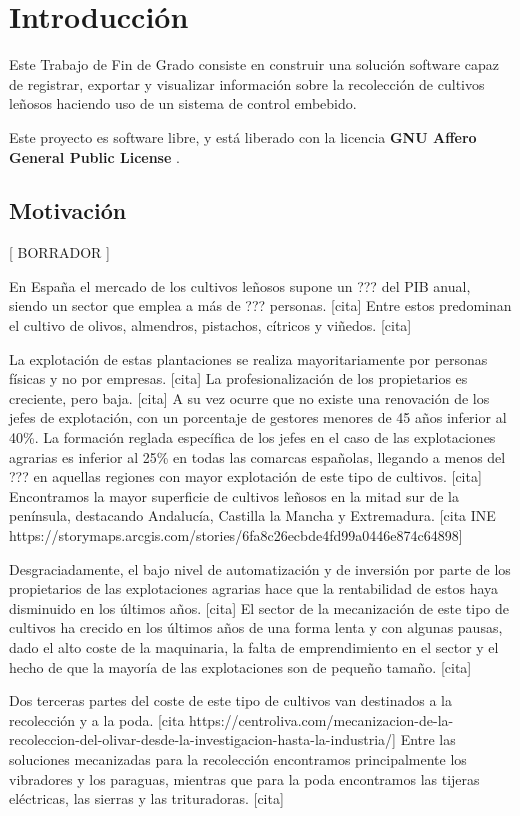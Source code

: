 \chapter{Introducción}

Este Trabajo de Fin de Grado consiste en construir una solución software
capaz de registrar, exportar y visualizar información sobre la recolección de cultivos
leñosos haciendo uso de un sistema de control embebido.

Este proyecto es software libre, y está liberado con
la licencia \textbf{GNU Affero General Public License} \cite{agplv3}.

\section{Motivación}

[ BORRADOR ]

En España el mercado de los cultivos leñosos supone un ??? del PIB
anual, siendo un sector que emplea a más de ??? personas. [cita] Entre estos
predominan el cultivo de olivos, almendros, pistachos, cítricos y
viñedos. [cita] 

La explotación de estas plantaciones se realiza mayoritariamente por personas
físicas y no por empresas. [cita] La profesionalización de los propietarios
es creciente, pero baja. [cita] A su vez ocurre que no existe una renovación
de los jefes de explotación, con un porcentaje de gestores menores de 45 años
inferior al 40\%. La formación reglada específica de los jefes en el caso de
las explotaciones agrarias es inferior al 25\% en todas las comarcas españolas,
llegando a menos del ??? en aquellas regiones con mayor
explotación de este tipo de cultivos. [cita] Encontramos la mayor superficie
de cultivos leñosos en la mitad sur de la península, destacando Andalucía,
Castilla la Mancha y Extremadura. [cita INE https://storymaps.arcgis.com/stories/6fa8c26ecbde4fd99a0446e874c64898]

Desgraciadamente, el bajo nivel de automatización y de inversión por parte
de los propietarios de las explotaciones agrarias hace que la rentabilidad
de estos haya disminuido en los últimos años. [cita]
El sector de la
mecanización de este tipo de cultivos ha crecido en los últimos años de una
forma lenta y con algunas pausas, dado el alto coste de la maquinaria, la
falta de emprendimiento en el sector y el hecho de que la mayoría de las
explotaciones son de pequeño tamaño. [cita] 

Dos terceras partes del
coste de este tipo de cultivos van destinados a la recolección y a la poda.
[cita https://centroliva.com/mecanizacion-de-la-recoleccion-del-olivar-desde-la-investigacion-hasta-la-industria/]
Entre las soluciones mecanizadas
para la recolección encontramos principalmente los vibradores y los paraguas,
mientras que para la poda encontramos las tijeras eléctricas, las sierras y
las trituradoras. [cita]

